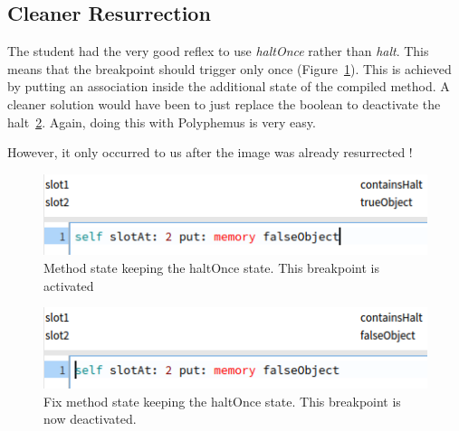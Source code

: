 
\subsection{Cleaner Resurrection}

The student had the very good reflex to use \textit{haltOnce} rather than \textit{halt}.
This means that the breakpoint should trigger only once (Figure~\ref{fig:prefix}).
This is achieved by putting an association inside the additional state of the compiled method.
A cleaner solution would have been to just replace the boolean to deactivate the halt~\ref{fig:postfix}.
Again, doing this with Polyphemus is very easy.

However, it only occurred to us after the image was already resurrected !


\begin{figure}[h]
    \centering
    \includegraphics[width=0.7\linewidth]{prefix}
    \caption{
    Method state keeping the haltOnce state.
    This breakpoint is activated
    }%
    \label{fig:prefix}
\end{figure}


\begin{figure}[h]
    \centering
    \includegraphics[width=0.7\linewidth]{postfix}
    \caption{
    Fix method state keeping the haltOnce state.
    This breakpoint is now deactivated.
    }%
    \label{fig:postfix}
\end{figure}
